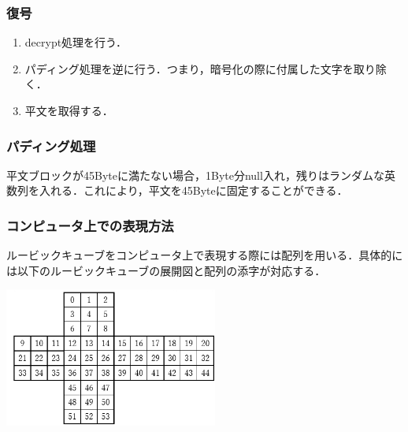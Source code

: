 \documentclass{jsarticle}
\begin{document}
\subsubsection{復号}
\begin{enumerate}
\item decrypt処理を行う．
\item パディング処理を逆に行う．つまり，暗号化の際に付属した文字を取り除く．
\item 平文を取得する．
\end{enumerate}

\subsubsection{パディング処理}
平文ブロックが45Byteに満たない場合，1Byte分null入れ，残りはランダムな英数列を入れる．これにより，平文を45Byteに固定することができる．

\subsubsection{コンピュータ上での表現方法}
ルービックキューブをコンピュータ上で表現する際には配列を用いる．具体的には以下のルービックキューブの展開図と配列の添字が対応する．\\

\begin{center}
  \includegraphics[width=7cm]{./tex_pic/seq.jpg}\\
\end{center}
    
\end{document}
